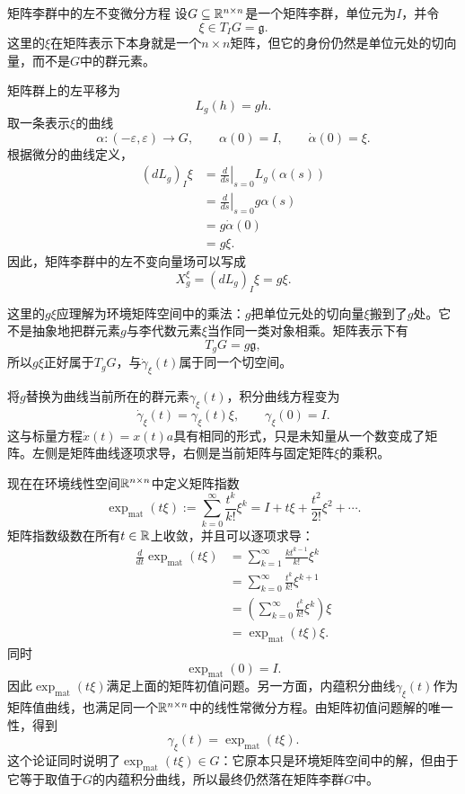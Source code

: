 \begin{lieexample}{矩阵李群中的左不变微分方程}
设$G\subseteq\mathbb{R}^{n\times n}$是一个矩阵李群，单位元为$I$，并令
\[
    \xi\in T_IG=\mathfrak g.
\]
这里的$\xi$在矩阵表示下本身就是一个$n\times n$矩阵，但它的身份仍然是单位元处的切向量，而不是$G$中的群元素。

矩阵群上的左平移为
\[
    L_g(h)=gh.
\]
取一条表示$\xi$的曲线
\[
    \alpha:(-\varepsilon,\varepsilon)\to G,
    \qquad
    \alpha(0)=I,
    \qquad
    \dot\alpha(0)=\xi.
\]
根据微分的曲线定义，
\[
\begin{aligned}
    (dL_g)_I\xi
    &=\left.\frac{d}{ds}\right|_{s=0}L_g(\alpha(s))\\
    &=\left.\frac{d}{ds}\right|_{s=0}g\alpha(s)\\
    &=g\dot\alpha(0)\\
    &=g\xi.
\end{aligned}
\]
因此，矩阵李群中的左不变向量场可以写成
\[
    \boxed{X^\xi_g=(dL_g)_I\xi=g\xi.}
\]

这里的$g\xi$应理解为环境矩阵空间中的乘法：$g$把单位元处的切向量$\xi$搬到了$g$处。它不是抽象地把群元素$g$与李代数元素$\xi$当作同一类对象相乘。矩阵表示下有
\[
    T_gG=g\mathfrak g,
\]
所以$g\xi$正好属于$T_gG$，与$\dot\gamma_\xi(t)$属于同一个切空间。

将$g$替换为曲线当前所在的群元素$\gamma_\xi(t)$，积分曲线方程变为
\[
    \boxed{
    \dot\gamma_\xi(t)=\gamma_\xi(t)\xi,
    \qquad
    \gamma_\xi(0)=I.
    }
\]
这与标量方程$\dot x(t)=x(t)a$具有相同的形式，只是未知量从一个数变成了矩阵。左侧是矩阵曲线逐项求导，右侧是当前矩阵与固定矩阵$\xi$的乘积。
\end{lieexample}

现在在环境线性空间$\mathbb{R}^{n\times n}$中定义矩阵指数
\[
    \exp_{\mathrm{mat}}(t\xi)
    :=\sum_{k=0}^{\infty}\frac{t^k}{k!}\xi^k
    =I+t\xi+\frac{t^2}{2!}\xi^2+\cdots.
\]
矩阵指数级数在所有$t\in\mathbb{R}$上收敛，并且可以逐项求导：
\[
\begin{aligned}
    \frac{d}{dt}\exp_{\mathrm{mat}}(t\xi)
    &=\sum_{k=1}^{\infty}\frac{k t^{k-1}}{k!}\xi^k\\
    &=\sum_{k=0}^{\infty}\frac{t^k}{k!}\xi^{k+1}\\
    &=\left(\sum_{k=0}^{\infty}\frac{t^k}{k!}\xi^k\right)\xi\\
    &=\exp_{\mathrm{mat}}(t\xi)\xi.
\end{aligned}
\]
同时
\[
    \exp_{\mathrm{mat}}(0)=I.
\]
因此$\exp_{\mathrm{mat}}(t\xi)$满足上面的矩阵初值问题。另一方面，内蕴积分曲线$\gamma_\xi(t)$作为矩阵值曲线，也满足同一个$\mathbb{R}^{n\times n}$中的线性常微分方程。由矩阵初值问题解的唯一性，得到
\[
    \boxed{
    \gamma_\xi(t)=\exp_{\mathrm{mat}}(t\xi).
    }
\]
这个论证同时说明了$\exp_{\mathrm{mat}}(t\xi)\in G$：它原本只是环境矩阵空间中的解，但由于它等于取值于$G$的内蕴积分曲线，所以最终仍然落在矩阵李群$G$中。


